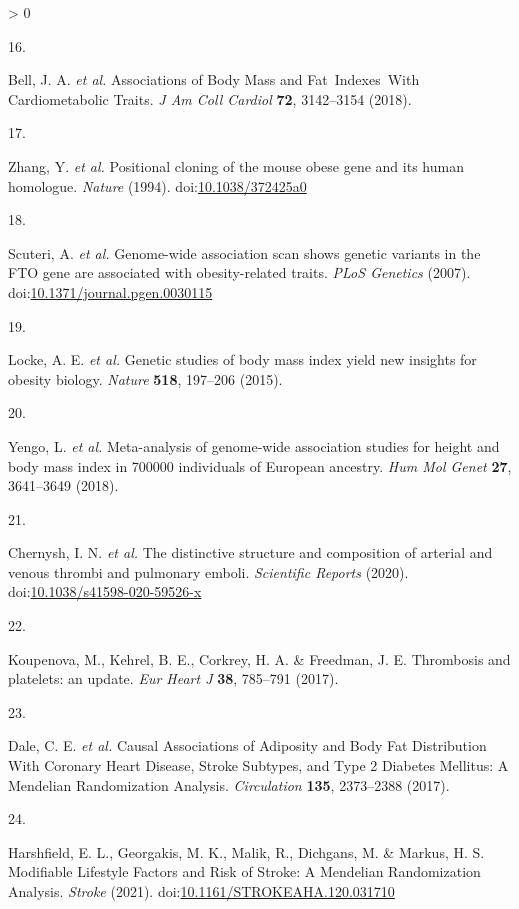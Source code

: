 \documentclass[11pt,twoside]{bristolthesis}
\newlength{\cslhangindent}
\newlength{\csllabelwidth}
\newenvironment{CSLReferences}[2] %
 {%
  \setlength{\parindent}{0pt}
  \ifodd #1 \everypar{\setlength{\hangindent}{\cslhangindent}}\ignorespaces\fi
  \ifnum #2 > 0
  \setlength{\parskip}{#2\baselineskip}
  \fi
 }%
 {}
\newcommand{\CSLLeftMargin}[1]{\parbox[t]{\csllabelwidth}{#1}}
\newcommand{\CSLRightInline}[1]{\parbox[t]{\linewidth - \csllabelwidth}{#1}\break}
\begin{document}
\begin{CSLReferences}{0}{0}
\leavevmode\hypertarget{ref-Bell2018}{}%
\CSLLeftMargin{16. }
\CSLRightInline{Bell, J. A. \emph{et al.} {Associations of Body Mass and Fat~Indexes~With Cardiometabolic Traits}. \emph{J Am Coll Cardiol} \textbf{72}, 3142--3154 (2018).}

\leavevmode\hypertarget{ref-Zhang1994}{}%
\CSLLeftMargin{17. }
\CSLRightInline{Zhang, Y. \emph{et al.} {Positional cloning of the mouse obese gene and its human homologue}. \emph{Nature} (1994). doi:\href{https://doi.org/10.1038/372425a0}{10.1038/372425a0}}

\leavevmode\hypertarget{ref-Scuteri2007}{}%
\CSLLeftMargin{18. }
\CSLRightInline{Scuteri, A. \emph{et al.} {Genome-wide association scan shows genetic variants in the FTO gene are associated with obesity-related traits}. \emph{PLoS Genetics} (2007). doi:\href{https://doi.org/10.1371/journal.pgen.0030115}{10.1371/journal.pgen.0030115}}

\leavevmode\hypertarget{ref-Locke2015}{}%
\CSLLeftMargin{19. }
\CSLRightInline{Locke, A. E. \emph{et al.} {Genetic studies of body mass index yield new insights for obesity biology}. \emph{Nature} \textbf{518}, 197--206 (2015).}

\leavevmode\hypertarget{ref-Yengo2018}{}%
\CSLLeftMargin{20. }
\CSLRightInline{Yengo, L. \emph{et al.} {Meta-analysis of genome-wide association studies for height and body mass index in 700000 individuals of European ancestry}. \emph{Hum Mol Genet} \textbf{27}, 3641--3649 (2018).}

\leavevmode\hypertarget{ref-Chernysh2020}{}%
\CSLLeftMargin{21. }
\CSLRightInline{Chernysh, I. N. \emph{et al.} {The distinctive structure and composition of arterial and venous thrombi and pulmonary emboli}. \emph{Scientific Reports} (2020). doi:\href{https://doi.org/10.1038/s41598-020-59526-x}{10.1038/s41598-020-59526-x}}

\leavevmode\hypertarget{ref-Koupenova2017a}{}%
\CSLLeftMargin{22. }
\CSLRightInline{Koupenova, M., Kehrel, B. E., Corkrey, H. A. \& Freedman, J. E. {Thrombosis and platelets: an update}. \emph{Eur Heart J} \textbf{38}, 785--791 (2017).}

\leavevmode\hypertarget{ref-Dale2017}{}%
\CSLLeftMargin{23. }
\CSLRightInline{Dale, C. E. \emph{et al.} {Causal Associations of Adiposity and Body Fat Distribution With Coronary Heart Disease, Stroke Subtypes, and Type 2 Diabetes Mellitus: A Mendelian Randomization Analysis}. \emph{Circulation} \textbf{135}, 2373--2388 (2017).}

\leavevmode\hypertarget{ref-Harshfield2021}{}%
\CSLLeftMargin{24. }
\CSLRightInline{Harshfield, E. L., Georgakis, M. K., Malik, R., Dichgans, M. \& Markus, H. S. {Modifiable Lifestyle Factors and Risk of Stroke: A Mendelian Randomization Analysis}. \emph{Stroke} (2021). doi:\href{https://doi.org/10.1161/STROKEAHA.120.031710}{10.1161/STROKEAHA.120.031710}}


\end{CSLReferences}
\end{document}
